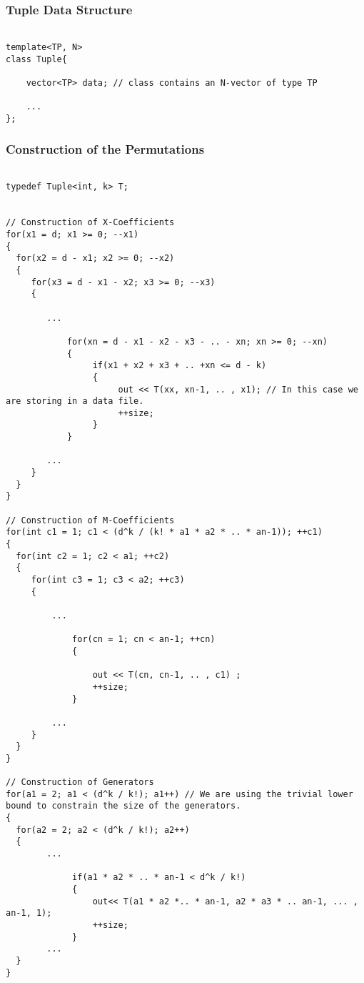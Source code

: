 \subsubsection*{Tuple Data Structure}

\begin{lstlisting}

template<TP, N>
class Tuple{

    vector<TP> data; // class contains an N-vector of type TP

    ...
};

\end{lstlisting}

\subsubsection*{Construction of the Permutations}

\begin{lstlisting}

typedef Tuple<int, k> T;


// Construction of X-Coefficients
for(x1 = d; x1 >= 0; --x1)
{
  for(x2 = d - x1; x2 >= 0; --x2)
  {
     for(x3 = d - x1 - x2; x3 >= 0; --x3) 
     {
    
        ...
            
            for(xn = d - x1 - x2 - x3 - .. - xn; xn >= 0; --xn)
            {
                 if(x1 + x2 + x3 + .. +xn <= d - k)
                 {
                      out << T(xx, xn-1, .. , x1); // In this case we are storing in a data file.
                      ++size;
                 }
            }

        ...
     }	
  }
}

// Construction of M-Coefficients
for(int c1 = 1; c1 < (d^k / (k! * a1 * a2 * .. * an-1)); ++c1)
{
  for(int c2 = 1; c2 < a1; ++c2)
  {
     for(int c3 = 1; c3 < a2; ++c3)
     {

         ...

             for(cn = 1; cn < an-1; ++cn)
             {

                 out << T(cn, cn-1, .. , c1) ;
                 ++size;
             }

         ...
     }
  }
}

// Construction of Generators
for(a1 = 2; a1 < (d^k / k!); a1++) // We are using the trivial lower bound to constrain the size of the generators.
{
  for(a2 = 2; a2 < (d^k / k!); a2++)
  {
        ...

             if(a1 * a2 * .. * an-1 < d^k / k!)
             {
                 out<< T(a1 * a2 *.. * an-1, a2 * a3 * .. an-1, ... , an-1, 1);
                 ++size;
             }
        ...
  }
}


\end{lstlisting}

